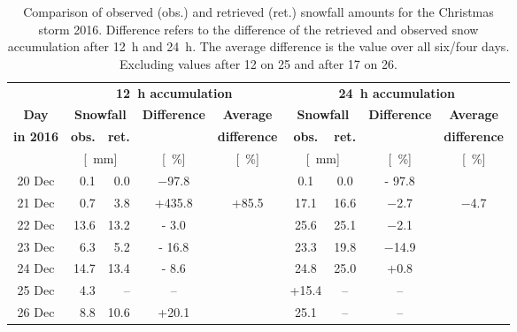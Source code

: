 \begin{table}[t!]
	\begin{center}
		\caption{Comparison of observed (obs.) and retrieved (ret.) snowfall amounts for the Christmas storm 2016. Difference refers to the difference of the retrieved and observed snow accumulation after \SI{12}{\hour} and \SI{24}{\hour}. The average difference is the value over all six/four days. Excluding values after \SI{12}{\UTC} on \SI{25}{\dec} and after \SI{17}{\UTC} on \SI{26}{\dec}.}\label{tab:res:ret_error}
		\begin{tabular}{c||r|r|c|c||c|c|c|c}
			\hline \hline
			& \multicolumn{4}{c||}{\textbf{\SI{12}{\hour} accumulation}} & \multicolumn{4}{c}{\textbf{\SI{24}{\hour} accumulation}}    \\ \cline{2-9}
            \textbf{Day} & \multicolumn{2}{c|}{\textbf{Snowfall}} & \textbf{Difference} & \textbf{Average} &  \multicolumn{2}{c|}{\textbf{Snowfall}} & \textbf{Difference} & \textbf{Average}  \\\cline{2-3} \cline{6-7}
            \textbf{in 2016} & \textbf{obs.} & \textbf{ret.} & & \textbf{difference} & \textbf{obs.} & \textbf{ret.} & & \textbf{difference} \\\cline{2-9}
			& \multicolumn{2}{c|}{[\SI{}{\mm}]} & [\SI{}{\percent}] & [\SI{}{\percent}] & \multicolumn{2}{c|}{[\SI{}{\mm}]} & [\SI{}{\percent}] & [\SI{}{\percent}] \\ \hline\hline
			\num{20} Dec & \num{0.1} &\num{0.0} & \num{-97.8} & & \num{0.1} & \num{0.0} & \num{- 97.8} &  \\\cline{1-9}
			\num{21} Dec & \num{0.7} & \num{3.8} & +\num{435.8} & \multirow{6}{*}{+\num{85.5}} & \num{17.1} & \num{16.6} & \num{-2.7} & \multirow{4}{*}{\num{-4.7}}   \\\cline{1-4}\cline{6-8}
			\num{22} Dec & \num{13.6}& \num{13.2} & \num{- 3.0} & & \num{25.6} &\num{25.1} & \num{-2.1} &   \\\cline{1-4}\cline{6-8}
			\num{23} Dec & \num{6.3} &\num{5.2} & \num{- 16.8} & & \num{23.3}& \num{19.8} & \num{-14.9} &   \\\cline{1-4}\cline{6-8}
			\num{24} Dec & \num{14.7} & \num{13.4} & \num{- 8.6} && \num{24.8} & \num{25.0} & +\num{0.8} &   \\\cline{1-4}\cline{6-9}
			\num{25} Dec &  \num{4.3} & -- & -- & & +\num{15.4} & -- & -- & \\\cline{1-4}\cline{6-9}
			\num{26} Dec & \num{8.8} & \num{10.6} & +\num{20.1} &  &  \num{25.1} &-- & -- &  \\\hline\hline
		\end{tabular}
	\end{center}
\end{table}
